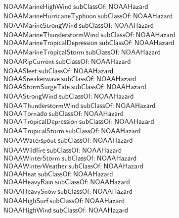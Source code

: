 \begin{align}
  \textsf{NOAAMarineHighWind}~\textsf{subClassOf:}~\textsf{NOAAHazard}\\
  \textsf{NOAAMarineHurricaneTyphoon}~\textsf{subClassOf:}~\textsf{NOAAHazard}\\
  \textsf{NOAAMarineStrongWind}~\textsf{subClassOf:}~\textsf{NOAAHazard}\\
  \textsf{NOAAMarineThunderstormWind}~\textsf{subClassOf:}~\textsf{NOAAHazard}\\
  \textsf{NOAAMarineTropicalDepression}~\textsf{subClassOf:}~\textsf{NOAAHazard}\\
  \textsf{NOAAMarineTropicalStorm}~\textsf{subClassOf:}~\textsf{NOAAHazard}\\
  \textsf{NOAARipCurrent}~\textsf{subClassOf:}~\textsf{NOAAHazard}\\
  \textsf{NOAASleet}~\textsf{subClassOf:}~\textsf{NOAAHazard}\\
  \textsf{NOAASneakerwave}~\textsf{subClassOf:}~\textsf{NOAAHazard}\\
  \textsf{NOAAStormSurgeTide}~\textsf{subClassOf:}~\textsf{NOAAHazard}\\
  \textsf{NOAAStrongWind}~\textsf{subClassOf:}~\textsf{NOAAHazard}\\
  \textsf{NOAAThunderstormWind}~\textsf{subClassOf:}~\textsf{NOAAHazard}\\
  \textsf{NOAATornado}~\textsf{subClassOf:}~\textsf{NOAAHazard}\\
  \textsf{NOAATropicalDepression}~\textsf{subClassOf:}~\textsf{NOAAHazard}\\
  \textsf{NOAATropicalStorm}~\textsf{subClassOf:}~\textsf{NOAAHazard}\\
  \textsf{NOAAWaterspout}~\textsf{subClassOf:}~\textsf{NOAAHazard}\\
  \textsf{NOAAWildfire}~\textsf{subClassOf:}~\textsf{NOAAHazard}\\
  \textsf{NOAAWinterStorm}~\textsf{subClassOf:}~\textsf{NOAAHazard}\\
  \textsf{NOAAWinterWeather}~\textsf{subClassOf:}~\textsf{NOAAHazard}\\
  \textsf{NOAAHeat}~\textsf{subClassOf:}~\textsf{NOAAHazard}\\
  \textsf{NOAAHeavyRain}~\textsf{subClassOf:}~\textsf{NOAAHazard}\\
  \textsf{NOAAHeavySnow}~\textsf{subClassOf:}~\textsf{NOAAHazard}\\
  \textsf{NOAAHighSurf}~\textsf{subClassOf:}~\textsf{NOAAHazard}\\
  \textsf{NOAAHighWind}~\textsf{subClassOf:}~\textsf{NOAAHazard}\\

\end{align}
